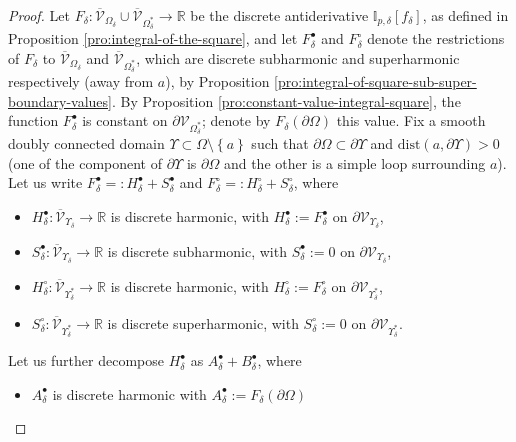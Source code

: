 \documentclass[oneside,english]{amsart}
\numberwithin{equation}{section}
\numberwithin{figure}{section}
\theoremstyle{plain}
\theoremstyle{plain}
\theoremstyle{plain}
\theoremstyle{plain}
\theoremstyle{plain}
\theoremstyle{definition}
\theoremstyle{remark}
\begin{document}
\begin{proof}
Let $F_{\delta}:\overline{\mathcal{V}}_{\Omega_{\delta}}\cup\overline{\mathcal{V}}_{\Omega_{\delta}^{*}}\to\mathbb{R}$
be the discrete antiderivative $\mathbb{I}_{p,\delta}\left[f_{\delta}\right]$,
as defined in Proposition \ref{pro:integral-of-the-square}, and let
$F_{\delta}^{\bullet}$ and $F_{\delta}^{\circ}$ denote the restrictions
of $F_{\delta}$ to $\overline{\mathcal{V}}_{\Omega_{\delta}}$ and
$\overline{\mathcal{V}}_{\Omega_{\delta}^{*}}$, which are discrete
subharmonic and superharmonic respectively (away from $a$), by Proposition
\ref{pro:integral-of-square-sub-super-boundary-values}. By Proposition
\ref{pro:constant-value-integral-square}, the function $F_{\delta}^{\bullet}$
is constant on $\partial\mathcal{V}_{\Omega_{\delta}^{*}}$; denote
by $F_{\delta}\left(\partial\Omega\right)$ this value. Fix a smooth
doubly connected domain $\Upsilon\subset\Omega\setminus\left\{ a\right\} $
such that $\partial\Omega\subset\partial\Upsilon$ and $\mathrm{dist}\left(a,\partial\Upsilon\right)>0$
(one of the component of $\partial\Upsilon$ is $\partial\Omega$
and the other is a simple loop surrounding $a$). Let us write $F_{\delta}^{\bullet}=:H_{\delta}^{\bullet}+S_{\delta}^{\bullet}$
and $F_{\delta}^{\circ}=:H_{\delta}^{\circ}+S_{\delta}^{\circ}$,
where
\begin{itemize}
\item $H_{\delta}^{\bullet}:\overline{\mathcal{V}}_{\Upsilon_{\delta}}\to\mathbb{R}$
is discrete harmonic, with $H_{\delta}^{\bullet}:=F_{\delta}^{\bullet}$
on $\partial\mathcal{V}_{\Upsilon_{\delta}}$,
\item $S_{\delta}^{\bullet}:\overline{\mathcal{V}}_{\Upsilon_{\delta}}\to\mathbb{R}$
is discrete subharmonic, with $S_{\delta}^{\bullet}:=0$ on $\partial\mathcal{V}_{\Upsilon_{\delta}}$,
\item $H_{\delta}^{\circ}:\overline{\mathcal{V}}_{\Upsilon_{\delta}^{*}}\to\mathbb{R}$
is discrete harmonic, with $H_{\delta}^{\circ}:=F_{\delta}^{\circ}$
on $\partial\mathcal{V}_{\Upsilon_{\delta}^{*}}$,
\item $S_{\delta}^{\circ}:\overline{\mathcal{V}}_{\Upsilon_{\delta}^{*}}\to\mathbb{R}$
is discrete superharmonic, with $S_{\delta}^{\circ}:=0$ on $\partial\mathcal{V}_{\Upsilon_{\delta}^{*}}$.
\end{itemize}
Let us further decompose $H_{\delta}^{\bullet}$ as $A_{\delta}^{\bullet}+B_{\delta}^{\bullet}$,
where 
\begin{itemize}
\item $A_{\delta}^{\bullet}$ is discrete harmonic with $A_{\delta}^{\bullet}:=F_{\delta}\left(\partial\Omega\right)$

\end{itemize}
\end{proof}
\end{document}
